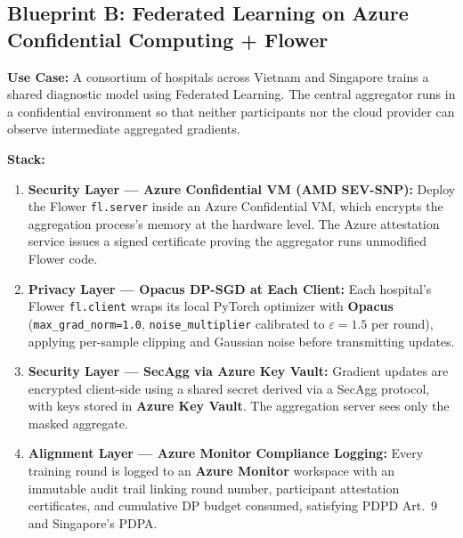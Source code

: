 \subsection{Blueprint B: Federated Learning on Azure Confidential Computing + Flower}
\label{sec:azure_blueprint}

\textbf{Use Case:} A consortium of hospitals across Vietnam and Singapore trains a shared diagnostic model using Federated Learning. The central aggregator runs in a confidential environment so that neither participants nor the cloud provider can observe intermediate aggregated gradients.

\textbf{Stack:}
\begin{enumerate}
  \item \textbf{Security Layer --- Azure Confidential VM (AMD SEV-SNP):} Deploy the Flower \texttt{fl.server} inside an Azure Confidential VM, which encrypts the aggregation process's memory at the hardware level. The Azure attestation service issues a signed certificate proving the aggregator runs unmodified Flower code.
  \item \textbf{Privacy Layer --- Opacus DP-SGD at Each Client:} Each hospital's Flower \texttt{fl.client} wraps its local PyTorch optimizer with \textbf{Opacus} (\texttt{max\_grad\_norm=1.0}, \texttt{noise\_multiplier} calibrated to $\varepsilon = 1.5$ per round), applying per-sample clipping and Gaussian noise before transmitting updates.
  \item \textbf{Security Layer --- SecAgg via Azure Key Vault:} Gradient updates are encrypted client-side using a shared secret derived via a SecAgg protocol, with keys stored in \textbf{Azure Key Vault}. The aggregation server sees only the masked aggregate.
  \item \textbf{Alignment Layer --- Azure Monitor Compliance Logging:} Every training round is logged to an \textbf{Azure Monitor} workspace with an immutable audit trail linking round number, participant attestation certificates, and cumulative DP budget consumed, satisfying PDPD Art.~9 and Singapore's PDPA.
\end{enumerate}

